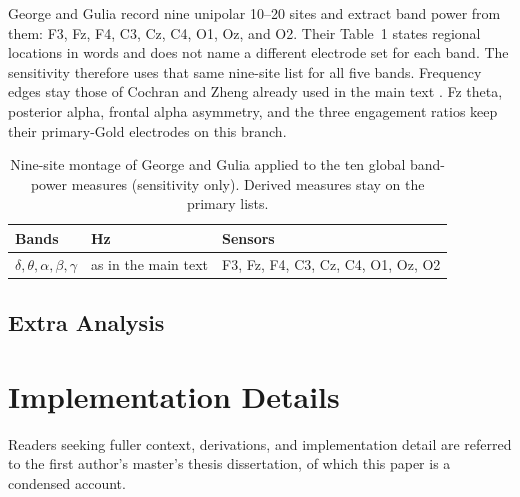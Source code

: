 \documentclass[english]{article}
\begin{document}
George and Gulia \cite{george2025relaxation} record nine unipolar 10--20 sites and extract band power from them: F3, Fz, F4, C3, Cz, C4, O1, Oz, and O2. Their Table~1 states regional locations in words and does not name a different electrode set for each band. The sensitivity therefore uses that same nine-site list for all five bands. Frequency edges stay those of Cochran and Zheng already used in the main text \cite{cochran1967fast,zheng2015investigating}. Fz theta, posterior alpha, frontal alpha asymmetry, and the three engagement ratios keep their primary-Gold electrodes on this branch.

\begin{table}[H]
\centering
\small
\caption{Nine-site montage of George and Gulia \cite{george2025relaxation} applied to the ten global band-power measures (sensitivity only).
Derived measures stay on the primary lists.}
\label{tab:eeg-literature-roi}
\begin{tabular}{@{}lll@{}}
\toprule
Bands & Hz & Sensors \\
\midrule
\(\delta,\theta,\alpha,\beta,\gamma\) & as in the main text & F3, Fz, F4, C3, Cz, C4, O1, Oz, O2 \\
\bottomrule
\end{tabular}
\end{table}

\subsection{Extra Analysis}

\section{Implementation Details}

Readers seeking fuller context, derivations, and implementation detail are referred to the first author's master's thesis dissertation, of which this paper is a condensed account.

\section{}
\end{document}
